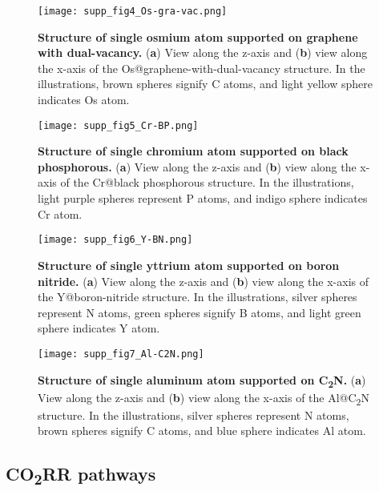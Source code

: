 \begin{figure}[htbp]
  \centering
  \texttt{[image: supp\_fig4\_Os-gra-vac.png]}
  \caption{\textbf{Structure of single osmium atom supported on graphene with dual-vacancy.}
  (\textbf{a}) View along the z-axis and (\textbf{b}) view along the x-axis
  of the Os@graphene-with-dual-vacancy structure.
  In the illustrations, brown spheres signify C atoms, and light yellow sphere
  indicates Os atom.}
  \label{supp_fig4:Os-gra-vac}
\end{figure}

\begin{figure}[htbp]
  \centering
  \texttt{[image: supp\_fig5\_Cr-BP.png]}
  \caption{\textbf{Structure of single chromium atom supported on black phosphorous.}
  (\textbf{a}) View along the z-axis and (\textbf{b}) view along the x-axis
  of the Cr@black phosphorous structure.
  In the illustrations, light purple spheres represent P atoms, and indigo sphere
  indicates Cr atom.}
  \label{supp_fig5:Cr-BP}
\end{figure}

\begin{figure}[htbp]
  \centering
  \texttt{[image: supp\_fig6\_Y-BN.png]}
  \caption{\textbf{Structure of single yttrium atom supported on boron nitride.}
  (\textbf{a}) View along the z-axis and (\textbf{b}) view along the x-axis
  of the Y@boron-nitride structure.
  In the illustrations, silver spheres represent N atoms, green spheres
  signify B atoms, and light green sphere indicates Y atom.}
  \label{supp_fig6:Y-BN}
\end{figure}

\begin{figure}[htbp]
  \centering
  \texttt{[image: supp\_fig7\_Al-C2N.png]}
  \caption{\textbf{Structure of single aluminum atom supported on C\textsubscript{2}N.}
  (\textbf{a}) View along the z-axis and (\textbf{b}) view along the x-axis
  of the Al@C\textsubscript{2}N structure.
  In the illustrations, silver spheres represent N atoms, brown spheres
  signify C atoms, and blue sphere indicates Al atom.}
  \label{supp_fig7:Al-C2N}
\end{figure}

\subsection{CO\textsubscript{2}RR pathways}
\label{supp_sec2.2_co2rr_paths}

